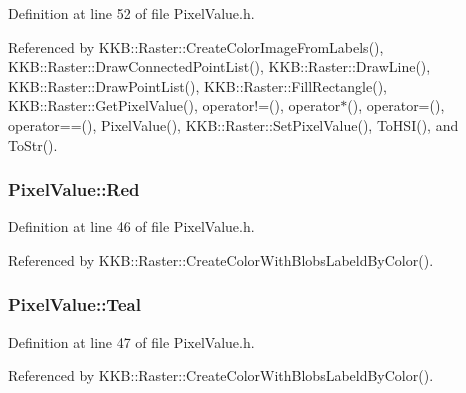 Definition at line 52 of file Pixel\+Value.\+h.



Referenced by K\+K\+B\+::\+Raster\+::\+Create\+Color\+Image\+From\+Labels(), K\+K\+B\+::\+Raster\+::\+Draw\+Connected\+Point\+List(), K\+K\+B\+::\+Raster\+::\+Draw\+Line(), K\+K\+B\+::\+Raster\+::\+Draw\+Point\+List(), K\+K\+B\+::\+Raster\+::\+Fill\+Rectangle(), K\+K\+B\+::\+Raster\+::\+Get\+Pixel\+Value(), operator!=(), operator$\ast$(), operator=(), operator==(), Pixel\+Value(), K\+K\+B\+::\+Raster\+::\+Set\+Pixel\+Value(), To\+H\+S\+I(), and To\+Str().

\subsubsection[{\texorpdfstring{Red}{Red}}]{ Pixel\+Value\+::\+Red\hspace{0.3cm}{\ttfamily [static]}}\hypertarget{class_k_k_b_1_1_pixel_value_a9d2c067be56aec7c69d00ec701020fca}{}\label{class_k_k_b_1_1_pixel_value_a9d2c067be56aec7c69d00ec701020fca}


Definition at line 46 of file Pixel\+Value.\+h.



Referenced by K\+K\+B\+::\+Raster\+::\+Create\+Color\+With\+Blobs\+Labeld\+By\+Color().

\subsubsection[{\texorpdfstring{Teal}{Teal}}]{ Pixel\+Value\+::\+Teal\hspace{0.3cm}{\ttfamily [static]}}\hypertarget{class_k_k_b_1_1_pixel_value_a3fab97045e7187877973856b6b38d9df}{}\label{class_k_k_b_1_1_pixel_value_a3fab97045e7187877973856b6b38d9df}


Definition at line 47 of file Pixel\+Value.\+h.



Referenced by K\+K\+B\+::\+Raster\+::\+Create\+Color\+With\+Blobs\+Labeld\+By\+Color().

